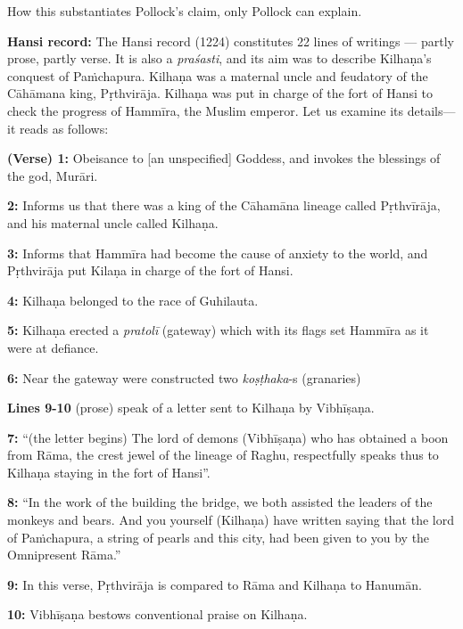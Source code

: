 How this substantiates Pollock’s claim, only Pollock can explain. 

\smallskip
\noindent
{\bf Hansi record:} The Hansi record (1224) constitutes 22 lines of writings — partly prose, partly verse. It is also a {\sl praśasti}, and its aim was to describe Kilhaṇa’s conquest of Paṁchapura. Kilhaṇa was a maternal uncle and feudatory of the Cāhāmana king, Pṛthvirāja. Kilhaṇa was put in charge of the fort of Hansi to check the progress of Hammīra, the Muslim emperor. Let us examine its details— it reads as follows:

\newpage

\noindent
{\bf (Verse) 1:} Obeisance to [an unspecified] Goddess, and invokes the blessings of the god, Murāri.

\smallskip
\noindent
{\bf 2:} Informs us that there was a king of the Cāhamāna lineage called Pṛthvīrāja, and his maternal uncle called Kilhaṇa. 

\smallskip
\noindent
{\bf 3:} Informs that Hammīra had become the cause of anxiety to the world, and Pṛthvirāja put Kilaṇa in charge of the fort of Hansi. 

\smallskip
\noindent
{\bf 4:} Kilhaṇa belonged to the race of Guhilauta. 

\smallskip
\noindent
{\bf 5:} Kilhaṇa erected a {\sl pratolī} (gateway) which with its flags set Hammīra as it were at defiance. 

\smallskip
\noindent
{\bf 6:} Near the gateway were constructed two {\sl koṣṭhaka}-s (granaries)

\smallskip
\noindent
{\bf Lines 9-10} (prose) speak of a letter sent to Kilhaṇa by Vibhīṣaṇa.

\smallskip
\noindent
{\bf 7:} “(the letter begins) The lord of demons (Vibhīṣaṇa) who has obtained a boon from Rāma, the crest jewel of the lineage of Raghu, respectfully speaks thus to Kilhaṇa staying in the fort of Hansi”.  

\smallskip
\noindent
{\bf 8:} “In the work of the building the bridge, we both assisted the leaders of the monkeys and bears. And you yourself (Kilhaṇa) have written saying that the lord of Paṁchapura, a string of pearls and this city, had been given to you by the Omnipresent Rāma.”

\smallskip
\noindent
{\bf 9:} In this verse, Pṛthvirāja is compared to Rāma and Kilhaṇa to Hanumān. 

\smallskip
\noindent
{\bf 10:} Vibhīṣaṇa bestows conventional praise on Kilhaṇa. 

